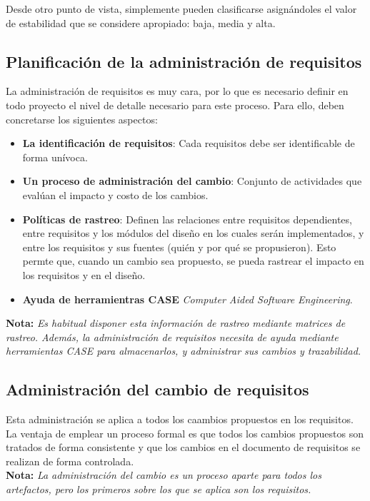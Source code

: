 Desde otro punto de vista, simplemente pueden clasificarse asignándoles el valor de estabilidad que se considere apropiado: baja, media y alta.

\subsection{Planificación de la administración de requisitos}

La administración de requisitos es muy cara, por lo que es necesario definir en todo proyecto el nivel de detalle necesario para este proceso. Para ello, deben concretarse los siguientes aspectos:

\begin{itemize}
    \item \textbf{La identificación de requisitos}: Cada requisitos debe ser identificable de forma unívoca.
    \item \textbf{Un proceso de administración del cambio}: Conjunto de actividades que evalúan el impacto y costo de los cambios.
    \item \textbf{Políticas de rastreo}: Definen las relaciones entre requisitos dependientes, entre requisitos y los módulos del diseño en los cuales serán implementados, y entre los requisitos y sus fuentes (quién y por qué se propusieron). Esto permte que, cuando un cambio sea propuesto, se pueda rastrear el impacto en los requisitos y en el diseño.
    \item \textbf{Ayuda de herramientras CASE} \textit{Computer Aided Software Engineering}.
\end{itemize}

\textbf{Nota:} \textit{Es habitual disponer esta información de rastreo mediante matrices de rastreo. Además, la administración de requisitos necesita de ayuda mediante herramientas CASE para almacenarlos, y administrar sus cambios y trazabilidad.}

\subsection{Administración del cambio de requisitos}

Esta administración se aplica a todos los caambios propuestos en los requisitos. La ventaja de emplear un proceso formal es que todos los cambios propuestos son tratados de forma consistente y que los cambios en el documento de requisitos se realizan de forma controlada.\\

\textbf{Nota:} \textit{La administración del cambio es un proceso aparte para todos los artefactos, pero los primeros sobre los que se aplica son los requisitos.}\\

